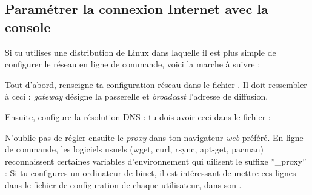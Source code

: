 \subsection{Paramétrer la connexion Internet avec la console}
\label{linux_cmdline}
Si tu utilises une distribution de Linux dans laquelle il est plus simple de configurer le réseau en ligne de commande, voici la marche à suivre :

Tout d'abord, renseigne ta configuration réseau dans le fichier . Il doit ressembler à ceci :
\noindent {}
\emph{gateway} désigne la passerelle et \emph{broadcast} l'adresse de diffusion.
\newline

Ensuite, configure la résolution DNS : tu dois avoir ceci dans le fichier  :
\noindent {}

N'oublie pas de régler ensuite le \emph{proxy} dans ton navigateur \emph{web} préféré.
En ligne de commande, les logiciels usuels (wget, curl, rsync, apt-get, pacman) reconnaissent certaines variables d'environnement qui uilisent le suffixe ''\_proxy'' :
\noindent {}
Si tu configures un ordinateur de binet, il est intéressant de mettre ces lignes dans le fichier de configuration de chaque utilisateur, dans son .
